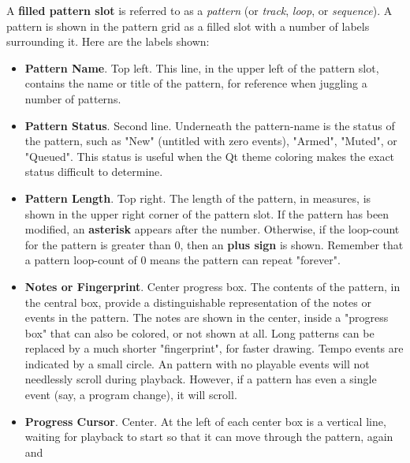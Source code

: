    A \textbf{filled pattern slot} is referred to as a \textsl{pattern}
   (or \textsl{track}, \textsl{loop}, or \textsl{sequence}).
   A pattern is shown in the pattern grid as a filled slot with a number of
   labels surrounding it.  Here are the labels shown:

   \begin{itemize}
      \item \textbf{Pattern Name}. Top left.
         This line, in the upper left of the pattern slot, contains the name or
         title of the pattern, for reference when juggling a number of
         patterns.
      \item \textbf{Pattern Status}. Second line.
         Underneath the pattern-name is the status of the pattern, such as
         "New" (untitled with zero events), "Armed", "Muted", or "Queued".
         This status is useful when the Qt theme coloring makes the exact
         status difficult to determine.
      \item \textbf{Pattern Length}. Top right.
         The length of the pattern, in measures, is shown in the upper
         right corner of the pattern slot.
         If the pattern has been modified, an \textbf{asterisk}
         appears after the
         number.
         Otherwise, if the loop-count for the pattern is greater than 0, 
         then an \textbf{plus sign} is shown.
         Remember that a pattern loop-count of 0 means the pattern can repeat
         "forever".
      \item \textbf{Notes or Fingerprint}. Center progress box.
         The contents of the pattern, in the central box,
         provide a distinguishable representation of the notes or events in the
         pattern.
         The notes are shown in the center, inside a "progress box" that
         can also be colored, or not shown at all.
         Long patterns can be replaced by a much shorter "fingerprint", for
         faster drawing.
         Tempo events are indicated by a small circle.
         An pattern with no playable events will not needlessly scroll
         during playback.
         However, if a pattern has even a single event (say, a program change),
         it will scroll.
      \item \textbf{Progress Cursor}. Center.
         At the left of each center box is a vertical line, waiting for
         playback to start so that it can move through the pattern, again and

\end{itemize}
